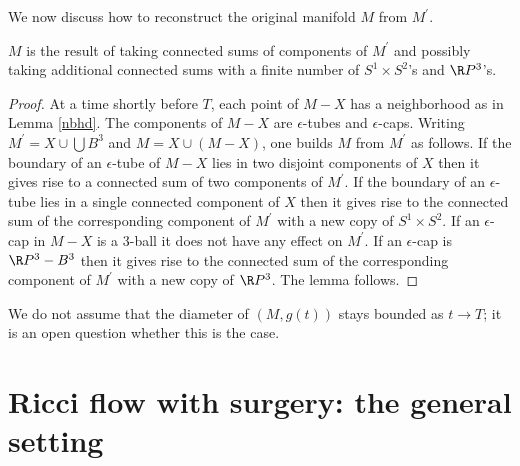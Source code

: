 We now discuss how to reconstruct the original manifold
$M$ from $M^\prime$.

\begin{lemma}
  \label{lem:kl-structure-at-first-singularity-time-structure-at-first-singularity-time-lemma-11}
 \label{reconstruct}
$M$ is the result of taking connected sums of components of $M^\prime$
and possibly taking additional connected sums with a finite number of
$S^1 \times S^2$'s and $\R P^3$'s.
\end{lemma}
\begin{proof}

At a time shortly before $T$,
each point of $M - X$ has a neighborhood as in Lemma
\ref{nbhd}. The components of $M-X$ are $\epsilon$-tubes and
$\epsilon$-caps.  Writing $M^\prime = X \cup \bigcup B^3$ and
$M = X \cup (M-X)$, one builds $M$ from
$M^\prime$ as follows.
If the boundary of an $\epsilon$-tube of $M-X$ lies in
two disjoint components of $X$ then it gives rise to
a connected sum of two components of $M^\prime$.  If the
boundary of an $\epsilon$-tube lies in a single connected
component of $X$ then it gives rise to the
connected sum of the corresponding component of $M^\prime$
with a new copy of $S^1 \times S^2$.
If an $\epsilon$-cap
in $M-X$
is a $3$-ball it does not have any effect
on $M^\prime$. If
an $\epsilon$-cap is $\R P^3 - B^3$ then it gives rise to the
connected sum of the corresponding component of $M^\prime$
with a new copy of $\R P^3$. The lemma follows.
\end{proof}

\begin{remark}
  \label{rem:kl-structure-at-first-singularity-time-estimates-diameter}

We do not assume that
the diameter of $(M, g(t))$ stays bounded as $t \rightarrow T$;
it is an open question whether this is the case.
\end{remark}

\section{Ricci flow with surgery:
the general setting}
\label{Ricci flow with surgery}

